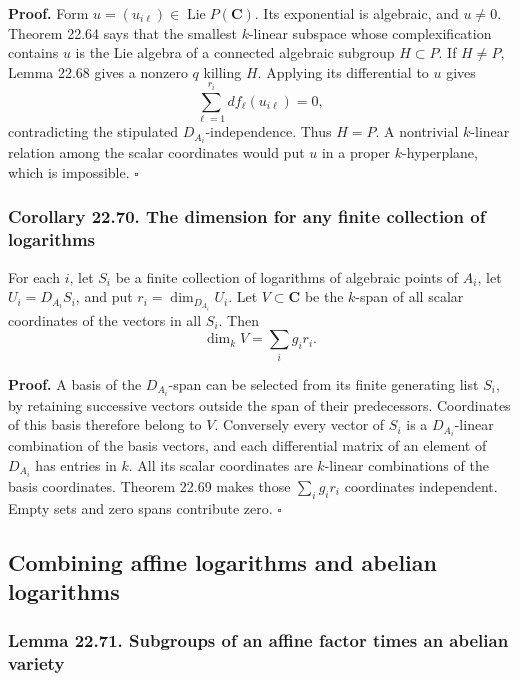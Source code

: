 \documentclass[
  11pt,
  a4paper,
]{article}
\begin{document}
\textbf{Proof.} Form \(u=(u_{i\ell})\in\operatorname{Lie}P(\mathbf C)\).
Its exponential is algebraic, and \(u\ne0\). Theorem 22.64 says that the
smallest \(k\)-linear subspace whose complexification contains \(u\) is
the Lie algebra of a connected algebraic subgroup \(H\subset P\). If
\(H\ne P\), Lemma 22.68 gives a nonzero \(q\) killing \(H\). Applying
its differential to \(u\) gives \[
 \sum_{\ell=1}^{r_i}df_\ell(u_{i\ell})=0,
 \tag{22.174}
\] contradicting the stipulated \(D_{A_i}\)-independence. Thus \(H=P\).
A nontrivial \(k\)-linear relation among the scalar coordinates would
put \(u\) in a proper \(k\)-hyperplane, which is impossible. \(\square\)

\subsubsection{Corollary 22.70. The dimension for any finite collection
of
logarithms}\label{corollary-22.70.-the-dimension-for-any-finite-collection-of-logarithms}

For each \(i\), let \(S_i\) be a finite collection of logarithms of
algebraic points of \(A_i\), let \(U_i=D_{A_i}S_i\), and put
\(r_i=\dim_{D_{A_i}}U_i\). Let \(V\subset\mathbf C\) be the \(k\)-span
of all scalar coordinates of the vectors in all \(S_i\). Then \[
 \dim_k V=\sum_i g_i r_i.
 \tag{22.175}
\]

\textbf{Proof.} A basis of the \(D_{A_i}\)-span can be selected from its
finite generating list \(S_i\), by retaining successive vectors outside
the span of their predecessors. Coordinates of this basis therefore
belong to \(V\). Conversely every vector of \(S_i\) is a
\(D_{A_i}\)-linear combination of the basis vectors, and each
differential matrix of an element of \(D_{A_i}\) has entries in \(k\).
All its scalar coordinates are \(k\)-linear combinations of the basis
coordinates. Theorem 22.69 makes those \(\sum_i g_i r_i\) coordinates
independent. Empty sets and zero spans contribute zero. \(\square\)

\subsection{Combining affine logarithms and abelian
logarithms}\label{combining-affine-logarithms-and-abelian-logarithms}

\subsubsection{Lemma 22.71. Subgroups of an affine factor times an
abelian
variety}\label{lemma-22.71.-subgroups-of-an-affine-factor-times-an-abelian-variety}
\end{document}
